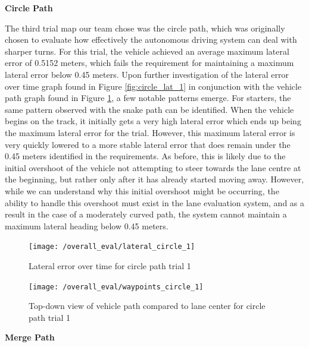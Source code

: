 \documentclass[titlepage, draft]{article}
\begin{document}
{\textbf{Circle Path}

The third trial map our team chose was the circle path, which was originally chosen to evaluate how effectively the autonomous driving system can deal with sharper turns. For this trial, the vehicle achieved an average maximum lateral error of 0.5152 meters, which fails the requirement for maintaining a maximum lateral error below 0.45 meters. Upon further investigation of the lateral error over time graph found in Figure \ref{fig:circle_lat_1} in conjunction with the vehicle path graph found in Figure \ref{fig:circle_way_1}, a few notable patterns emerge. For starters, the same pattern observed with the snake path can be identified. When the vehicle begins on the track, it initially gets a very high lateral error which ends up being the maximum lateral error for the trial. However, this maximum lateral error is very quickly lowered to a more stable lateral error that does remain under the 0.45 meters identified in the requirements. As before, this is likely due to the initial overshoot of the vehicle not attempting to steer towards the lane centre at the beginning, but rather only after it has already started moving away. However, while we can understand why this initial overshoot might be occurring, the ability to handle this overshoot must exist in the lane evaluation system, and as a result in the case of a moderately curved path, the system cannot maintain a maximum lateral heading below 0.45 meters.\\

\begin{figure}
	\centering
	\begin{minipage}{.45\textwidth}
		\centering
		\texttt{[image: /overall\_eval/lateral\_circle\_1]}
		\caption{Lateral error over time for circle path trial 1}
		\label{fig:circle_lat_1}
	\end{minipage}%
	\hspace{0.1\textwidth}%
	\begin{minipage}{.45\textwidth}
		\centering
		\texttt{[image: /overall\_eval/waypoints\_circle\_1]}
		\caption{Top-down view of vehicle path compared to lane center for circle path trial 1}
		\label{fig:circle_way_1}
	\end{minipage}
\end{figure}

\textbf{Merge Path}

}
\end{document}
